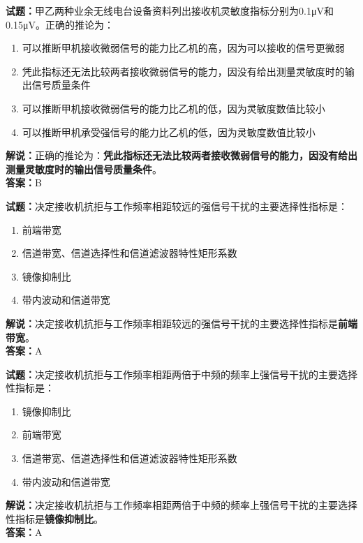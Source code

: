 \documentclass{ctexbook}
\begin{document}


\bigskip


\noindent\textbf{试题：}甲乙两种业余无线电台设备资料列出接收机灵敏度指标分别为0.1μV和0.15μV。正确的推论为：
\begin{enumerate}[leftmargin=3em]
\item 可以推断甲机接收微弱信号的能力比乙机的高，因为可以接收的信号更微弱
\item 凭此指标还无法比较两者接收微弱信号的能力，因没有给出测量灵敏度时的输出信号质量条件
\item 可以推断甲机接收微弱信号的能力比乙机的低，因为灵敏度数值比较小
\item 可以推断甲机承受强信号的能力比乙机的低，因为灵敏度数值比较小
\end{enumerate}
\noindent\textbf{解说：}正确的推论为：\textbf{凭此指标还无法比较两者接收微弱信号的能力，因没有给出测量灵敏度时的输出信号质量条件}。\\\noindent\textbf{答案：}B



\bigskip


\noindent\textbf{试题：}决定接收机抗拒与工作频率相距较远的强信号干扰的主要选择性指标是：
\begin{enumerate}[leftmargin=3em]
\item 前端带宽
\item 信道带宽、信道选择性和信道滤波器特性矩形系数
\item 镜像抑制比
\item 带内波动和信道带宽
\end{enumerate}
\noindent\textbf{解说：}决定接收机抗拒与工作频率相距较远的强信号干扰的主要选择性指标是\textbf{前端带宽}。\\\noindent\textbf{答案：}A

\bigskip


\noindent\textbf{试题：}决定接收机抗拒与工作频率相距两倍于中频的频率上强信号干扰的主要选择性指标是：
\begin{enumerate}[leftmargin=3em]
\item 镜像抑制比
\item 前端带宽
\item 信道带宽、信道选择性和信道滤波器特性矩形系数
\item 带内波动和信道带宽
\end{enumerate}
\noindent\textbf{解说：}决定接收机抗拒与工作频率相距两倍于中频的频率上强信号干扰的主要选择性指标是\textbf{镜像抑制比}。\\\noindent\textbf{答案：}A
\end{document}

